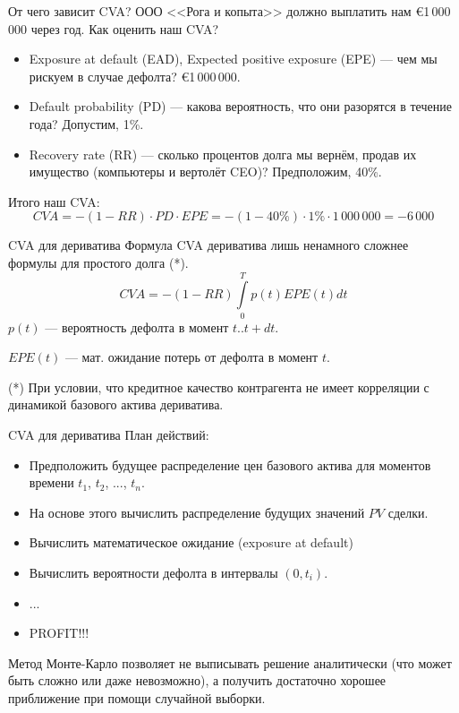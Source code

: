 \documentclass{beamer}
\begin{document}
\begin{frame}{От чего зависит CVA?}
\justify
ООО <<Рога и копыта>> должно выплатить нам \euro1\,000\,000 через год. Как оценить наш CVA?
\begin{itemize}
\justifying
\item Exposure at default (EAD), Expected positive exposure (EPE) --- чем мы рискуем в случае дефолта? \euro1\,000\,000.
\item Default probability (PD) --- какова вероятность, что они разорятся в течение года? Допустим, 1\%.
\item Recovery rate (RR) --- сколько процентов долга мы вернём, продав их имущество (компьютеры и вертолёт CEO)? Предположим, 40\%.
\end{itemize}

Итого наш CVA:
\begin{equation*}
CVA = - (1-RR) \cdot PD \cdot EPE = -(1-40\%) \cdot 1\% \cdot 1\,000\,000 = -6\,000
\end{equation*}
\end{frame}



\begin{frame}{CVA для дериватива}
\justify
Формула CVA дериватива лишь ненамного сложнее формулы для простого долга (*).
\begin{equation*}
CVA = - (1-RR)\int\limits_{0}^{T} p(t)EPE(t)dt
\end{equation*}
$p(t)$ --- вероятность дефолта в момент $t..t+dt$.

$EPE(t)$ --- мат. ожидание потерь от дефолта в момент $t$.

\vspace{\baselineskip}
(*) При условии, что кредитное качество контрагента не имеет корреляции с динамикой базового актива дериватива.
\end{frame}



\begin{frame}{CVA для дериватива}
\justify
План действий:
\begin{itemize}
\justifying
\item Предположить будущее распределение цен базового актива для моментов времени $t_1$, $t_2$, ..., $t_n$.
\item На основе этого вычислить распределение будущих значений $PV$ сделки.
\item Вычислить математическое ожидание (exposure at default)
\item Вычислить вероятности дефолта в интервалы $(0, t_i)$.
\item ...
\item PROFIT!!!
\end{itemize}

Метод Монте-Карло позволяет не выписывать решение аналитически (что может быть сложно или даже невозможно), а получить достаточно хорошее приближение при помощи случайной выборки.
\end{frame}
\end{document}
